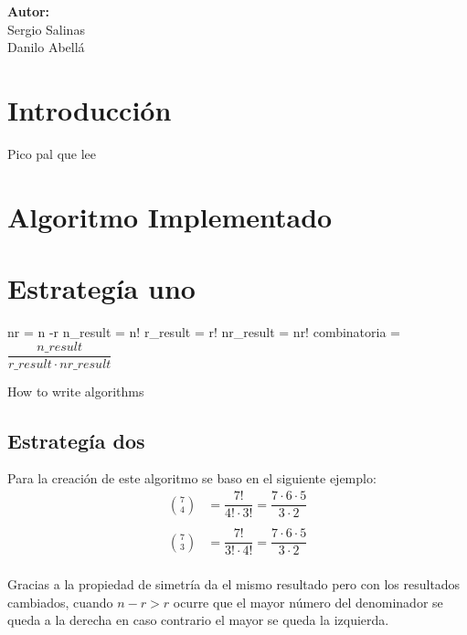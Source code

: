 \documentclass[12pt,letterpaper]{scrartcl}
\begin{document}
\begin{titlepage}
\begin{center}
\begin{minipage}[l]{0.4\textwidth}
	\begin{flushright}

		\textbf{\textsf{Autor:}}\\
		\linespread{1}
		\large Sergio Salinas\\
		\large Danilo Abellá\\

	\end{flushright}
\end{minipage}

\end{center}

\end{titlepage}

\section*{Introducción}

Pico pal que lee
\section{Algoritmo Implementado}

\section{Estrategía uno}

\begin{algorithm}[H]
	nr = n -r\;
	n\_result = n! \;
	r\_result = r! \;
	nr\_result = nr! \;
	combinatoria = $\dfrac{n\_result}{r\_result \cdot nr\_result}$ \;
 \caption{How to write algorithms}
\end{algorithm}

\subsection{Estrategía dos}

Para la creación de este algoritmo se baso en el siguiente ejemplo:
\[\begin{matrix}
{7 \choose 4}  &= \dfrac{7!}{4! \cdot 3!} = \dfrac{7 \cdot 6 \cdot 5}{3 \cdot 2}\\ 
 &\\
{7 \choose 3}  &= \dfrac{7!}{3!\cdot4!} = \dfrac{7 \cdot 6 \cdot 5}{3 \cdot 2 }\\
\end{matrix}
\]

Gracias a la propiedad de simetría da el mismo resultado pero con los resultados cambiados, cuando $n-r > r$ ocurre que el mayor número del denominador se queda a la derecha en caso contrario el mayor se queda la izquierda.
\end{document}
